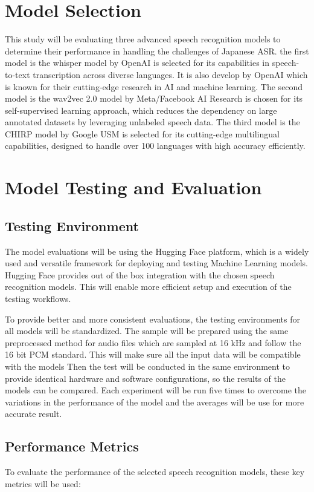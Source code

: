 \section{Model Selection}
This study will be evaluating three advanced speech recognition models to determine their performance in handling the challenges of Japanese ASR. the first model is the whisper model by OpenAI is selected for its capabilities in speech-to-text transcription across diverse languages. It is also develop by OpenAI which is known for their cutting-edge research in AI and machine learning. The second model is the wav2vec 2.0 model by Meta/Facebook AI Research is chosen for its self-supervised learning approach, which reduces the dependency on large annotated datasets by leveraging unlabeled speech data. The third model is the CHIRP model by Google USM is selected for its cutting-edge multilingual capabilities, designed to handle over 100 languages with high accuracy efficiently.

\section{Model Testing and Evaluation}
\subsection{Testing Environment}
The model evaluations will be using the Hugging Face platform, which is a widely used and versatile framework for deploying and testing Machine Learning models. Hugging Face provides out of the box integration with the chosen speech recognition models. This will enable more efficient setup and execution of the testing workflows.

To provide better and more consistent evaluations, the testing environments for all models will be standardized. The sample will be prepared using the same preprocessed method for audio files which are sampled at 16 kHz and follow the 16 bit PCM standard. This will make sure all the input data will be compatible with the models Then the test will be conducted in the same environment to provide identical hardware and software configurations, so the results of the models can be compared. Each experiment will be run five times to overcome the variations in the performance of the model and the averages will be use for more accurate result.


\subsection{Performance Metrics}
To evaluate the performance of the selected speech recognition models, these key metrics will be used:

